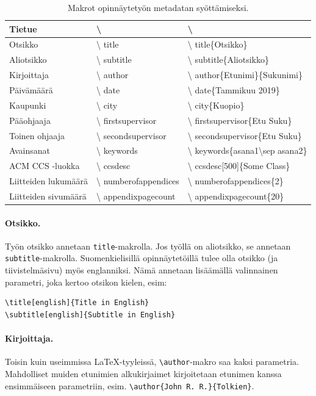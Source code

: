 \begin{table}
  \centering
  \caption{Makrot opinnäytetyön metadatan syöttämiseksi.}
  \label{tab:metadata_macros}
  \small
  \begin{tabular}{
    @{}
    l
    >{\ttfamily\textbackslash}l
    >{\ttfamily\textbackslash}l
    @{}
    }
    \toprule
    Tietue & \multicolumn{1}{c}{Makro} & \multicolumn{1}{c}{Esimerkki} \\
    \midrule
    Otsikko  & title & title\{Otsikko\} \\
    Aliotsikko & subtitle & subtitle\{Aliotsikko\} \\
    Kirjoittaja & author & author\{Etunimi\}\{Sukunimi\} \\
    Päivämäärä & date & date\{Tammikuu 2019\} \\
    Kaupunki & city & city\{Kuopio\} \\
    Pääohjaaja & firstsupervisor & firstsupervisor\{Etu Suku\} \\
    Toinen ohjaaja & secondsupervisor & secondsupervisor\{Etu Suku\} \\
    Avainsanat & keywords & keywords\{asana1\textbackslash sep asana2\} \\
    ACM CCS -luokka & ccsdesc & ccsdesc[500]\{Some Class\} \\
    Liitteiden lukumäärä & numberofappendices & numberofappendices\{2\} \\
    Liitteiden sivumäärä & appendixpagecount & appendixpagecount\{20\} \\
    \bottomrule
  \end{tabular}
\end{table}



\paragraph{Otsikko.}
Työn otsikko annetaan \texttt{title}-makrolla. Jos työllä on aliotsikko, se annetaan \texttt{subtitle}-makrolla. Suomenkielisillä opinnäytetöillä tulee olla otsikko (ja tiivistelmäsivu) myös englanniksi. Nämä annetaan lisäämällä valinnainen parametri, joka kertoo otsikon kielen, esim:
\begin{verbatim}
\title[english]{Title in English} 
\subtitle[english]{Subtitle in English}
\end{verbatim}

\paragraph{Kirjoittaja.}
Toisin kuin useimmissa \LaTeX-tyyleissä, \verb+\author+-makro saa kaksi parametria. Mahdolliset muiden etunimien alkukirjaimet kirjoitetaan etunimen kanssa  ensimmäiseen parametriin, esim. \verb+\author{John R. R.}{Tolkien}+.

